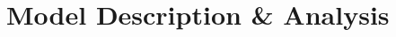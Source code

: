 \documentclass[twocolumn,preprintnumbers,amsmath,amssymb,superscriptaddress]{revtex4}
\begin{document}
% 
% 
% 
% 
% 


\section{Model Description \& Analysis}
\end{document}
